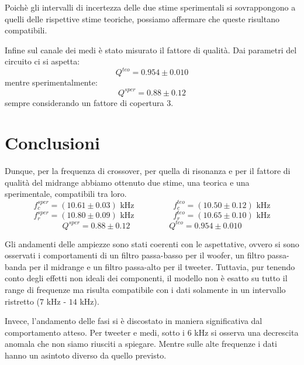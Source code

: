 \documentclass[12pt,italian]{article}
\begin{document}
\noindent
Poichè gli intervalli di incertezza delle due stime sperimentali si
sovrappongono a quelli delle rispettive stime teoriche, possiamo affermare che
queste risultano compatibili.

Infine sul canale dei medi è stato misurato il fattore di qualità. Dai
parametri del circuito ci si aspetta:
\begin{equation*}
	Q^{teo} = 0.954 \pm 0.010
\end{equation*}
mentre sperimentalmente:
\begin{equation*}
	Q^{sper} = 0.88 \pm 0.12
\end{equation*}
sempre considerando un fattore di copertura $3$.

\section*{Conclusioni}

Dunque, per la frequenza di crossover, per quella di risonanza e per il fattore
di qualità del midrange abbiamo ottenuto due stime, una teorica e una
sperimentale, compatibili tra loro.
\begin{equation*}
	f_{c}^{sper} = (10.61 \pm 0.03) \text{ kHz} \hspace{2cm}
	f_{c}^{teo} = (10.50 \pm 0.12) \text{ kHz}
\end{equation*}
\begin{equation*}
	f_{r}^{sper} = (10.80 \pm 0.09) \text{ kHz}
	\hspace{2cm} f_{r}^{teo} = (10.65 \pm 0.10) \text{ kHz}
\end{equation*}
\begin{equation*}
	Q^{sper} = 0.88 \pm 0.12 \hspace{2cm} Q^{teo} = 0.954 \pm 0.010
\end{equation*}

Gli andamenti delle ampiezze sono stati coerenti con le aspettative, ovvero si
sono osservati i comportamenti di un filtro passa-basso per il woofer, un
filtro passa-banda per il midrange e un filtro passa-alto per il tweeter.
Tuttavia, pur tenendo conto degli effetti non ideali dei componenti, il modello
non è esatto su tutto il range di frequenze ma risulta compatibile con i dati
solamente in un intervallo ristretto ($7$ kHz - $14$ kHz).

Invece, l'andamento delle fasi si è discostato in maniera significativa dal
comportamento atteso. Per tweeter e medi, sotto i $6$ kHz si osserva una
decrescita anomala che non siamo riusciti a spiegare. Mentre sulle alte
frequenze i dati hanno un asintoto diverso da quello previsto.
\end{document}
